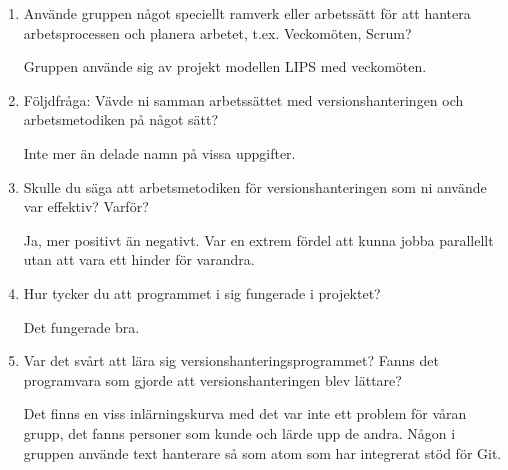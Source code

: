 \begin{enumerate}
  \item Använde gruppen något speciellt ramverk eller arbetssätt för att hantera arbetsprocessen och planera arbetet, t.ex. Veckomöten, Scrum?

  Gruppen använde sig av projekt modellen LIPS med veckomöten.

  \item Följdfråga: Vävde ni samman arbetssättet med versionshanteringen och arbetsmetodiken på något sätt?

  Inte mer än delade namn på vissa uppgifter.

  \item Skulle du säga att arbetsmetodiken för versionshanteringen som ni använde var effektiv? Varför?

  Ja, mer positivt än negativt. Var en extrem fördel att kunna jobba parallellt utan att vara ett hinder för varandra.

  \item Hur tycker du att programmet i sig fungerade i projektet?

  Det fungerade bra.

  \item Var det svårt att lära sig versionshanteringsprogrammet? Fanns det programvara som gjorde att versionshanteringen blev lättare?

  Det finns en viss inlärningskurva med det var inte ett problem för våran grupp, det fanns personer som kunde och lärde upp de andra. Någon i gruppen använde text hanterare så som atom som har integrerat stöd för Git.

\end{enumerate}






